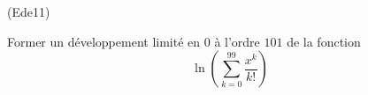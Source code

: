 \begin{tiny}(Ede11)\end{tiny} 
Former un développement limité en $0$ à l'ordre $101$ de la fonction
\begin{displaymath}
 \ln\left( \sum_{k=0}^{99}\frac{x^k}{k!}\right) 
\end{displaymath}
